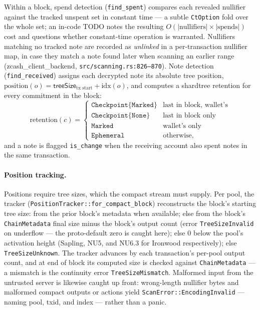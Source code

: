 \documentclass[11pt,a4paper]{article}
\theoremstyle{definition}
\begin{document}
Within a block, spend detection (\texttt{find\_spent}) compares each
revealed nullifier against the tracked unspent set in constant time --- a
\textsf{subtle} \texttt{CtOption} fold over the whole set; an in-code TODO
notes the resulting
$O(|\text{nullifiers}| \times |\text{spends}|)$ cost and questions whether
constant-time operation is warranted. Nullifiers matching no tracked note
are recorded as \emph{unlinked} in a per-transaction nullifier map, in case
they match a note found later when scanning an earlier range
(\textsf{zcash\_client\_backend}, \texttt{src/scanning.rs:826--870}).
Note detection (\texttt{find\_received}) assigns each decrypted note its
absolute tree position,
$\mathrm{position}(o) = \mathsf{treeSize}_{\text{tx start}} +
\mathrm{idx}(o)$, and computes a \textsf{shardtree} retention for every
commitment in the block:
\[
\mathrm{retention}(c) =
\begin{cases}
\texttt{Checkpoint\{Marked\}} & \text{last in block, wallet's} \\
\texttt{Checkpoint\{None\}}   & \text{last in block only} \\
\texttt{Marked}               & \text{wallet's only} \\
\texttt{Ephemeral}            & \text{otherwise,}
\end{cases}
\]
and a note is flagged \texttt{is\_change} when the receiving account also
spent notes in the same transaction.

\paragraph{Position tracking.} Positions require tree sizes, which the
compact stream must supply. Per pool, the tracker
(\texttt{PositionTracker::for\_compact\_block}) reconstructs the block's
starting tree size: from the prior block's metadata when available; else
from the block's \texttt{ChainMetadata} final size minus the block's output
count (error \texttt{TreeSizeInvalid} on underflow --- the proto-default
zero is caught here); else $0$ below the pool's activation height (Sapling,
NU5, and NU6.3 for Ironwood respectively); else \texttt{TreeSizeUnknown}.
The tracker advances by each transaction's per-pool output count, and at
end of block its computed size is checked against \texttt{ChainMetadata}
--- a mismatch is the continuity error \texttt{TreeSizeMismatch}.
Malformed input from the untrusted server is likewise caught up front:
wrong-length nullifier bytes and malformed compact outputs or actions yield
\texttt{ScanError::EncodingInvalid} --- naming pool, txid, and index ---
rather than a panic.
\end{document}
